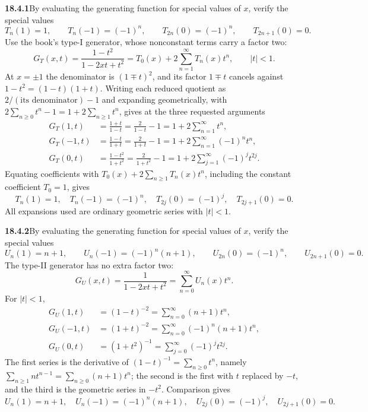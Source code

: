 \par\bigskip
\noindent\textbf{18.4.1}\quad By evaluating the generating function
for special values of $x$, verify the special values
\[
T_{n}(1)=1,\qquad T_{n}(-1)=(-1)^{n},\qquad T_{2n}(0)=(-1)^{n},
\qquad T_{2n+1}(0)=0.
\]
\solution
Use the book's type-I generator, whose nonconstant terms carry a
factor two:
\[
G_T(x,t)=\frac{1-t^2}{1-2xt+t^2}
       =T_0(x)+2\sum_{n=1}^\infty T_n(x)t^n,\qquad |t|<1.
\]
At $x=\pm1$ the denominator is $(1\mp t)^2$, and its factor $1\mp t$
cancels against $1-t^2=(1-t)(1+t)$.  Writing each reduced quotient as
$2/(\text{its denominator})-1$ and expanding geometrically, with
$2\sum_{n\ge0}t^n-1=1+2\sum_{n\ge1}t^n$, gives at the three requested
arguments
\begin{align*}
G_T(1,t)&=\frac{1+t}{1-t}=\frac2{1-t}-1
        =1+2\sum_{n=1}^\infty t^n,\\
G_T(-1,t)&=\frac{1-t}{1+t}=\frac2{1+t}-1
        =1+2\sum_{n=1}^\infty(-1)^nt^n,\\
G_T(0,t)&=\frac{1-t^2}{1+t^2}=\frac2{1+t^2}-1
        =1+2\sum_{j=1}^\infty(-1)^jt^{2j}.
\end{align*}
Equating coefficients with $T_0(x)+2\sum_{n\ge1}T_n(x)t^n$, including
the constant coefficient $T_0=1$, gives
\[
\boxed{T_n(1)=1,\quad T_n(-1)=(-1)^n,\quad
T_{2j}(0)=(-1)^j,\quad T_{2j+1}(0)=0}.
\]
All expansions used are ordinary geometric series with $|t|<1$.

\par\bigskip
\noindent\textbf{18.4.2}\quad By evaluating the generating function
for special values of $x$, verify the special values
\[
U_{n}(1)=n+1,\qquad U_{n}(-1)=(-1)^{n}(n+1),\qquad
U_{2n}(0)=(-1)^{n},\qquad U_{2n+1}(0)=0.
\]
\solution
The type-II generator has no extra factor two:
\[
G_U(x,t)=\frac1{1-2xt+t^2}=\sum_{n=0}^\infty U_n(x)t^n.
\]
For $|t|<1$,
\begin{align*}
G_U(1,t)&=(1-t)^{-2}=\sum_{n=0}^\infty(n+1)t^n,\\
G_U(-1,t)&=(1+t)^{-2}=\sum_{n=0}^\infty(-1)^n(n+1)t^n,\\
G_U(0,t)&=(1+t^2)^{-1}=\sum_{j=0}^\infty(-1)^jt^{2j}.
\end{align*}
The first series is the derivative of $(1-t)^{-1}=\sum_{n\ge0}t^n$,
namely $\sum_{n\ge1}nt^{n-1}=\sum_{n\ge0}(n+1)t^n$; the second is the
first with $t$ replaced by $-t$, and the third is the geometric series
in $-t^2$.  Comparison gives
\[
\boxed{U_n(1)=n+1,\quad U_n(-1)=(-1)^n(n+1),\quad
U_{2j}(0)=(-1)^j,\quad U_{2j+1}(0)=0}.
\]

